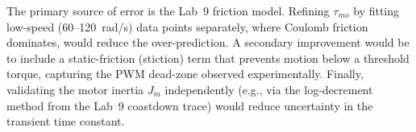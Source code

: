 \documentclass{article}
\begin{document}
The primary source of error is the Lab~9 friction model. Refining $\tau_{mo}$ by fitting low-speed (60--120~rad/s) data points separately, where Coulomb friction dominates, would reduce the over-prediction. A secondary improvement would be to include a static-friction (stiction) term that prevents motion below a threshold torque, capturing the PWM dead-zone observed experimentally. Finally, validating the motor inertia $J_m$ independently (e.g., via the log-decrement method from the Lab~9 coastdown trace) would reduce uncertainty in the transient time constant.
\end{document}
